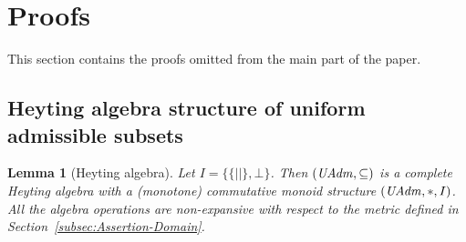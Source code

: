 \documentclass{LMCS}
\newtheorem{lemma}[theorem]{Lemma}
\theoremstyle{remark}
\newcommand{\record}[1]{\ensuremath{\left.\!\{\!|{#1}|\!\}\right.\!}}
\begin{document}
\section{Proofs}

This section contains the proofs omitted from the main part of the paper. 

\subsection{Heyting algebra structure of uniform admissible subsets}
\label{app:subsec:assertions}

\begin{lemma}[Heyting algebra]
\label{lem:UAdm-Heyting}
Let $I=\{\record{},\bot\}$. 
Then $(\mathit{UAdm},\subseteq)$ is a complete Heyting algebra
with a (monotone) commutative monoid structure $(\mathit{UAdm},*,I)$.
All the algebra operations are non-expansive with respect to the metric defined in Section~\ref{subsec:Assertion-Domain}. 
\end{lemma}
\end{document}
